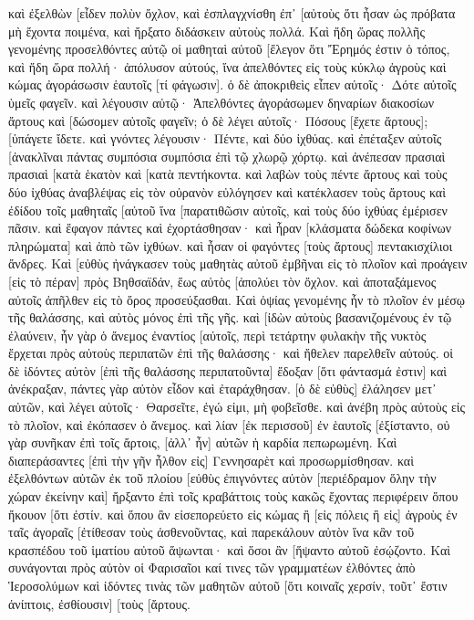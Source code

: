 καὶ ἐξελθὼν [εἶδεν πολὺν ὄχλον, καὶ ἐσπλαγχνίσθη ἐπ᾽ [αὐτοὺς ὅτι ἦσαν ὡς πρόβατα μὴ ἔχοντα ποιμένα, καὶ ἤρξατο διδάσκειν αὐτοὺς πολλά. 
Καὶ ἤδη ὥρας πολλῆς γενομένης προσελθόντες αὐτῷ οἱ μαθηταὶ αὐτοῦ [ἔλεγον ὅτι Ἔρημός ἐστιν ὁ τόπος, καὶ ἤδη ὥρα πολλή· 
ἀπόλυσον αὐτούς, ἵνα ἀπελθόντες εἰς τοὺς κύκλῳ ἀγροὺς καὶ κώμας ἀγοράσωσιν ἑαυτοῖς [τί φάγωσιν]. 
ὁ δὲ ἀποκριθεὶς εἶπεν αὐτοῖς· Δότε αὐτοῖς ὑμεῖς φαγεῖν. καὶ λέγουσιν αὐτῷ· Ἀπελθόντες ἀγοράσωμεν δηναρίων διακοσίων ἄρτους καὶ [δώσομεν αὐτοῖς φαγεῖν; 
ὁ δὲ λέγει αὐτοῖς· Πόσους [ἔχετε ἄρτους]; [ὑπάγετε ἴδετε. καὶ γνόντες λέγουσιν· Πέντε, καὶ δύο ἰχθύας. 
καὶ ἐπέταξεν αὐτοῖς [ἀνακλῖναι πάντας συμπόσια συμπόσια ἐπὶ τῷ χλωρῷ χόρτῳ. 
καὶ ἀνέπεσαν πρασιαὶ πρασιαὶ [κατὰ ἑκατὸν καὶ [κατὰ πεντήκοντα. 
καὶ λαβὼν τοὺς πέντε ἄρτους καὶ τοὺς δύο ἰχθύας ἀναβλέψας εἰς τὸν οὐρανὸν εὐλόγησεν καὶ κατέκλασεν τοὺς ἄρτους καὶ ἐδίδου τοῖς μαθηταῖς [αὐτοῦ ἵνα [παρατιθῶσιν αὐτοῖς, καὶ τοὺς δύο ἰχθύας ἐμέρισεν πᾶσιν. 
καὶ ἔφαγον πάντες καὶ ἐχορτάσθησαν· 
καὶ ἦραν [κλάσματα δώδεκα κοφίνων πληρώματα] καὶ ἀπὸ τῶν ἰχθύων. 
καὶ ἦσαν οἱ φαγόντες [τοὺς ἄρτους] πεντακισχίλιοι ἄνδρες. 
Καὶ [εὐθὺς ἠνάγκασεν τοὺς μαθητὰς αὐτοῦ ἐμβῆναι εἰς τὸ πλοῖον καὶ προάγειν [εἰς τὸ πέραν] πρὸς Βηθσαϊδάν, ἕως αὐτὸς [ἀπολύει τὸν ὄχλον. 
καὶ ἀποταξάμενος αὐτοῖς ἀπῆλθεν εἰς τὸ ὄρος προσεύξασθαι. 
Καὶ ὀψίας γενομένης ἦν τὸ πλοῖον ἐν μέσῳ τῆς θαλάσσης, καὶ αὐτὸς μόνος ἐπὶ τῆς γῆς. 
καὶ [ἰδὼν αὐτοὺς βασανιζομένους ἐν τῷ ἐλαύνειν, ἦν γὰρ ὁ ἄνεμος ἐναντίος [αὐτοῖς, περὶ τετάρτην φυλακὴν τῆς νυκτὸς ἔρχεται πρὸς αὐτοὺς περιπατῶν ἐπὶ τῆς θαλάσσης· καὶ ἤθελεν παρελθεῖν αὐτούς. 
οἱ δὲ ἰδόντες αὐτὸν [ἐπὶ τῆς θαλάσσης περιπατοῦντα] ἔδοξαν [ὅτι φάντασμά ἐστιν] καὶ ἀνέκραξαν, 
πάντες γὰρ αὐτὸν εἶδον καὶ ἐταράχθησαν. [ὁ δὲ εὐθὺς] ἐλάλησεν μετ᾽ αὐτῶν, καὶ λέγει αὐτοῖς· Θαρσεῖτε, ἐγώ εἰμι, μὴ φοβεῖσθε. 
καὶ ἀνέβη πρὸς αὐτοὺς εἰς τὸ πλοῖον, καὶ ἐκόπασεν ὁ ἄνεμος. καὶ λίαν [ἐκ περισσοῦ] ἐν ἑαυτοῖς [ἐξίσταντο, 
οὐ γὰρ συνῆκαν ἐπὶ τοῖς ἄρτοις, [ἀλλ᾽ ἦν] αὐτῶν ἡ καρδία πεπωρωμένη. 
Καὶ διαπεράσαντες [ἐπὶ τὴν γῆν ἦλθον εἰς] Γεννησαρὲτ καὶ προσωρμίσθησαν. 
καὶ ἐξελθόντων αὐτῶν ἐκ τοῦ πλοίου [εὐθὺς ἐπιγνόντες αὐτὸν 
[περιέδραμον ὅλην τὴν χώραν ἐκείνην καὶ] ἤρξαντο ἐπὶ τοῖς κραβάττοις τοὺς κακῶς ἔχοντας περιφέρειν ὅπου ἤκουον [ὅτι ἐστίν. 
καὶ ὅπου ἂν εἰσεπορεύετο εἰς κώμας ἢ [εἰς πόλεις ἢ εἰς] ἀγροὺς ἐν ταῖς ἀγοραῖς [ἐτίθεσαν τοὺς ἀσθενοῦντας, καὶ παρεκάλουν αὐτὸν ἵνα κἂν τοῦ κρασπέδου τοῦ ἱματίου αὐτοῦ ἅψωνται· καὶ ὅσοι ἂν [ἥψαντο αὐτοῦ ἐσῴζοντο. 
Καὶ συνάγονται πρὸς αὐτὸν οἱ Φαρισαῖοι καί τινες τῶν γραμματέων ἐλθόντες ἀπὸ Ἱεροσολύμων 
καὶ ἰδόντες τινὰς τῶν μαθητῶν αὐτοῦ [ὅτι κοιναῖς χερσίν, τοῦτ᾽ ἔστιν ἀνίπτοις, ἐσθίουσιν] [τοὺς [ἄρτους. 
